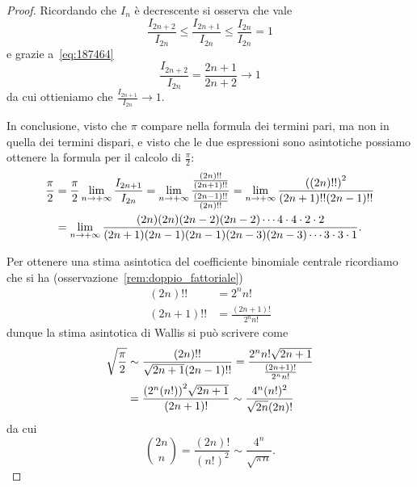 \begin{proof}
Ricordando che $I_n$ è decrescente si osserva
che vale
\[
  \frac{I_{2n+2}}{I_{2n}}
  \le \frac{I_{2n+1}}{I_{2n}}
  \le \frac{I_{2n}}{I_{2n}} = 1
\]
e grazie a~\eqref{eq:187464}
\[
 \frac{I_{2n+2}}{I_{2n}}
 = \frac{2n+1}{2n+2} \to 1
\]
da cui ottieniamo che $\frac{I_{2n+1}}{I_{2n}}\to 1$.

In conclusione, visto che $\pi$ compare nella formula dei termini pari, ma
non in quella dei termini dispari, e visto che le due espressioni sono
asintotiche possiamo ottenere
la formula per il calcolo di $\frac \pi 2$:
\begin{align*}
\frac{\pi}{2}
&= \frac{\pi}{2} \lim_{n\to +\infty} \frac{I_{2n+1}}{I_{2n}}
= \lim_{n\to +\infty} \frac{\frac{(2n)!!}{(2n+1)!!}}{\frac{(2n-1)!!}{(2n)!!}}
= \lim_{n\to +\infty} \frac{{\left( (2n)!! \right)}^2}{(2n+1)!!(2n-1)!!} \\
&= \lim_{n\to +\infty} \frac{(2n)(2n)(2n-2)(2n-2) \cdots 4\cdot 4 \cdot 2 \cdot 2}
  {(2n+1)(2n-1)(2n-1)(2n-3)(2n-3)\cdots 3 \cdot 3 \cdot 1}.
\end{align*}

Per ottenere una stima asintotica del coefficiente binomiale centrale
ricordiamo che si ha (osservazione~\ref{rem:doppio_fattoriale})
\begin{align*}
  (2n)!! &= 2^n n! \\
  (2n+1)!! &= \frac{(2n+1)!}{2^n n!}
\end{align*}
dunque la stima asintotica di Wallis si può scrivere come
\begin{align*}
 \sqrt{\frac{\pi}{2}}
 &\sim \frac{(2n)!!}{\sqrt{2n+1}(2n-1)!!}
  = \frac{2^n n!\sqrt{2n+1}}{\frac{(2n+1)!}{2^n n!}} \\
 &= \frac{{\left( 2^n (n!) \right)}^2 \sqrt{2n+1}}{(2n+1)!} 
 \sim \frac{4^n (n!)^2}{\sqrt{2n}(2n)!}
\end{align*}
da cui
\[
{2n \choose n}
= \frac{(2n)!}{(n!)^2}
\sim \frac{4^n}{\sqrt{\pi n}}.
\]
\end{proof}


